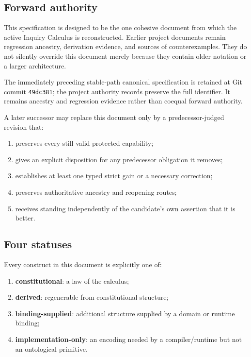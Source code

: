 \documentclass[11pt,oneside]{article}
\begin{document}
\subsection{Forward authority}

This specification is designed to be the one cohesive document from which the active Inquiry Calculus is reconstructed.  Earlier project documents remain regression ancestry, derivation evidence, and sources of counterexamples.  They do not silently override this document merely because they contain older notation or a larger architecture.

The immediately preceding stable-path canonical specification is retained at Git commit \texttt{49dc381}; the project authority records preserve the full identifier.  It remains ancestry and regression evidence rather than coequal forward authority.

A later successor may replace this document only by a predecessor-judged revision that:
\begin{enumerate}
\item preserves every still-valid protected capability;
\item gives an explicit disposition for any predecessor obligation it removes;
\item establishes at least one typed strict gain or a necessary correction;
\item preserves authoritative ancestry and reopening routes;
\item receives standing independently of the candidate's own assertion that it is better.
\end{enumerate}

\subsection{Four statuses}

Every construct in this document is explicitly one of:
\begin{enumerate}
\item \textbf{constitutional}: a law of the calculus;
\item \textbf{derived}: regenerable from constitutional structure;
\item \textbf{binding-supplied}: additional structure supplied by a domain or runtime binding;
\item \textbf{implementation-only}: an encoding needed by a compiler/runtime but not an ontological primitive.
\end{enumerate}
\end{document}
